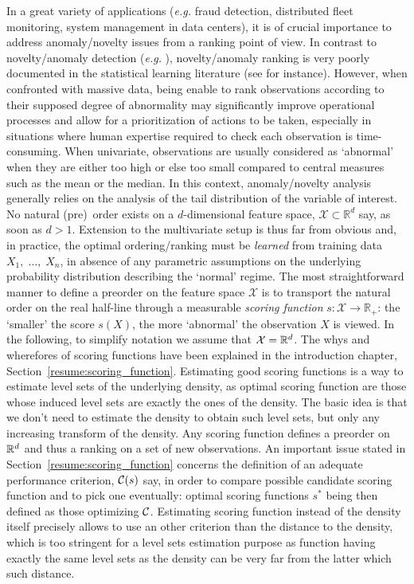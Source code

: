 In a great variety of applications  (\textit{e.g.} fraud detection, distributed fleet monitoring, system management in data centers), it is of crucial importance to address anomaly/novelty issues from a ranking point of view. In contrast to novelty/anomaly detection (\textit{e.g.} \cite{Kolt97, VertVert, Scholkopf2001, SHS05}), novelty/anomaly ranking is very poorly documented in the statistical learning literature (see \cite{VCTWMS} for instance). However, when confronted with
massive data, being enable to rank observations according to their supposed
degree of abnormality may significantly improve operational processes and allow for a prioritization of actions to be taken, especially in situations where human expertise required to check each observation is time-consuming.
When univariate, observations are usually considered as `abnormal'
when they are either too high or else too small compared to central
measures such as the mean or the median. In this context, anomaly/novelty analysis generally relies
on the analysis of the tail distribution of the variable of interest.  No natural (pre)~order exists on a $d$-dimensional feature space,  $\mathcal{X} \subset\mathbb{R}^d$ say, as soon as $d>1$. Extension to the multivariate setup is thus far from obvious and, in practice, the optimal ordering/ranking must be \textit{learned} from training data $X_1,\; \ldots,\; X_n$, in absence of any parametric assumptions on the underlying probability distribution describing the `normal' regime. The most straightforward manner to define a preorder on the feature space $\mathcal{X}$ is to transport the natural
order on the real half-line through a measurable \textit{scoring
  function} $s:\mathcal{X} \rightarrow \mathbb{R}_+$: the
`smaller' the score $s(X)$, the more `abnormal' the observation $X$ is
viewed. In the following, to simplify notation we assume that $\mathcal{X} = \mathbb{R}^d$.
%
The whys and wherefores of scoring functions have been explained in the introduction chapter, Section~\ref{resume:scoring_function}. Estimating good scoring functions is a way to estimate level sets of the underlying density, as optimal scoring function are those whose induced level sets are exactly the ones of the density. The basic idea is that we don't need to estimate the density to obtain such level sets, but only any increasing transform of the density.
%
Any scoring function defines a preorder on $\mathbb{R}^d$ and thus a ranking on a set of new observations. An important issue stated in Section~\ref{resume:scoring_function} concerns the definition of an adequate performance criterion, $\mathcal{C}(s)$ say, in order to compare possible candidate scoring function and to pick one eventually: optimal scoring functions $s^*$ being then defined as those optimizing $\mathcal{C}$. 
Estimating scoring function instead of the density itself precisely allows to use an other criterion than the distance to the density, which is too stringent for a level sets estimation purpose as function having exactly the same level sets as the density can be very far from the latter which such distance.

